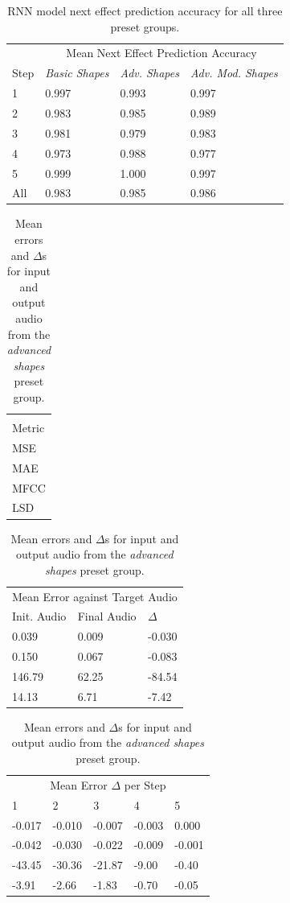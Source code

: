 \documentclass{article}
\begin{document}
\bigskip
\bigskip

\begin{table}[h]
  \caption{RNN model next effect prediction accuracy for all three preset groups.}
  \centering
  \begin{tabular}{llll}
    \toprule
    & \multicolumn{3}{c}{Mean Next Effect Prediction Accuracy} \\
    \cmidrule(r){2-4}
    Step & \emph{Basic Shapes} & \emph{Adv. Shapes} & \emph{Adv. Mod. Shapes} \\
    \midrule
    1 & 0.997 & 0.993 & 0.997 \\
    2 & 0.983 & 0.985 & 0.989 \\
    3 & 0.981 & 0.979 & 0.983 \\
    4 & 0.973 & 0.988 & 0.977 \\
    5 & 0.999 & 1.000 & 0.997 \\
    \midrule
    All & 0.983 & 0.985 & 0.986 \\
    \bottomrule
  \end{tabular}
\end{table}

\bigskip
\bigskip

\begin{table}[h]
  \caption{Mean errors and $\Delta$s for input and output audio from the \emph{advanced shapes} preset group.}
  \centering
  \begin{tabular}{l}
    \toprule
    \multicolumn{1}{c}{} \\
    \cmidrule(r){1-1}
    Metric \\
    \midrule
    MSE \\
    MAE \\
    MFCC \\
    LSD \\
    \bottomrule
  \end{tabular}
  \begin{tabular}{lll}
    \toprule
    \multicolumn{3}{c}{Mean Error against Target Audio} \\
    \cmidrule(r){1-3}
    Init. Audio & Final Audio & $\Delta$ \\
    \midrule
    0.039 & 0.009 & -0.030 \\
    0.150 & 0.067 & -0.083 \\
    146.79 & 62.25 & -84.54 \\
    14.13 & 6.71 & -7.42 \\
    \bottomrule
  \end{tabular}
  \begin{tabular}{lllll}
    \toprule
    \multicolumn{5}{c}{Mean Error $\Delta$ per Step} \\
    \cmidrule(r){1-5}
    1 & 2 & 3 & 4 & 5 \\
    \midrule
    -0.017 & -0.010 & -0.007 & -0.003 & 0.000 \\
    -0.042 & -0.030 & -0.022 & -0.009 & -0.001 \\
    -43.45 & -30.36 & -21.87 & -9.00 & -0.40 \\
    -3.91 & -2.66 & -1.83 & -0.70 & -0.05 \\
    \bottomrule
  \end{tabular}
\end{table}
\end{document}
